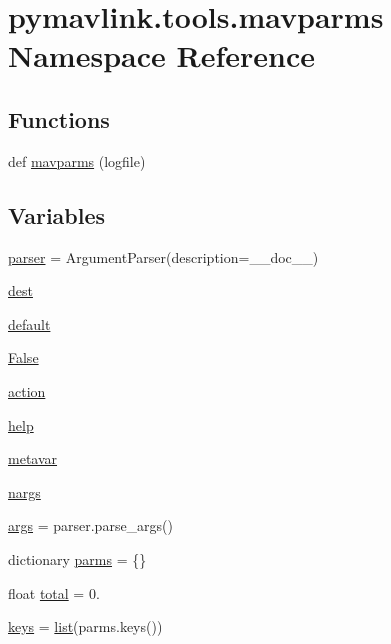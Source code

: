 \hypertarget{namespacepymavlink_1_1tools_1_1mavparms}{}\section{pymavlink.\+tools.\+mavparms Namespace Reference}
\label{namespacepymavlink_1_1tools_1_1mavparms}
\subsection*{Functions}
\begin{DoxyCompactItemize}
\item 
def \mbox{\hyperlink{namespacepymavlink_1_1tools_1_1mavparms_a2c8ba68bb852463fbf55c9823e303d0a}{mavparms}} (logfile)
\end{DoxyCompactItemize}
\subsection*{Variables}
\begin{DoxyCompactItemize}
\item 
\mbox{\hyperlink{namespacepymavlink_1_1tools_1_1mavparms_abd5bf4b8edf8066f393ef01047150db3}{parser}} = Argument\+Parser(description=\+\_\+\+\_\+doc\+\_\+\+\_\+)
\item 
\mbox{\hyperlink{namespacepymavlink_1_1tools_1_1mavparms_ae8257e4c1de9553194d17207a86a112c}{dest}}
\item 
\mbox{\hyperlink{namespacepymavlink_1_1tools_1_1mavparms_a0c74e867bb0c2fe3a7d103c99cbf61cf}{default}}
\item 
\mbox{\hyperlink{namespacepymavlink_1_1tools_1_1mavparms_a8603a388c99f72e5408543ec0432df20}{False}}
\item 
\mbox{\hyperlink{namespacepymavlink_1_1tools_1_1mavparms_ac3b752a6d40c36b801353d1fc4896fd3}{action}}
\item 
\mbox{\hyperlink{namespacepymavlink_1_1tools_1_1mavparms_af8ace9de095be86b4e3cc4174646e70e}{help}}
\item 
\mbox{\hyperlink{namespacepymavlink_1_1tools_1_1mavparms_abb05e0331b316963e2c81d834b757e61}{metavar}}
\item 
\mbox{\hyperlink{namespacepymavlink_1_1tools_1_1mavparms_a1280df9dc56e20275e61dca76693ef16}{nargs}}
\item 
\mbox{\hyperlink{namespacepymavlink_1_1tools_1_1mavparms_a4662189bac9fd0d1bce1ac1dab0e97b8}{args}} = parser.\+parse\+\_\+args()
\item 
dictionary \mbox{\hyperlink{namespacepymavlink_1_1tools_1_1mavparms_a21ffbe397fd9d7863328a0214b9b8f99}{parms}} = \{\}
\item 
float \mbox{\hyperlink{namespacepymavlink_1_1tools_1_1mavparms_a6271ff9e3daaa2fd996e1fa2e6967bf5}{total}} = 0.
\item 
\mbox{\hyperlink{namespacepymavlink_1_1tools_1_1mavparms_a6af3ade534f0b7d99e4082a023acdbb8}{keys}} = \mbox{\hyperlink{structlist}{list}}(parms.\+keys())
\end{DoxyCompactItemize}


